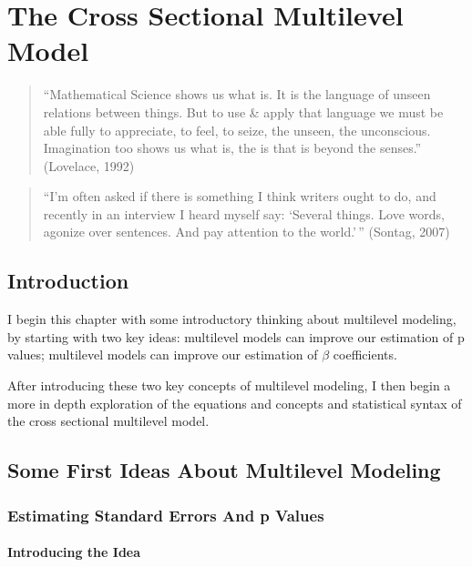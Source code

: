 \documentclass[
  letterpaper,
  DIV=11,
  numbers=noendperiod]{scrreprt}
\begin{document}

\chapter{The Cross Sectional Multilevel Model}\label{sec-crosssectional}

\begin{quote}
``Mathematical Science shows us what is. It is the language of unseen
relations between things. But to use \& apply that language we must be
able fully to appreciate, to feel, to seize, the unseen, the
unconscious. Imagination too shows us what is, the is that is beyond the
senses.'' (Lovelace, 1992) 
\end{quote}

\begin{quote}
``I'm often asked if there is something I think writers ought to do, and
recently in an interview I heard myself say: `Several things. Love
words, agonize over sentences. And pay attention to the world.'\,''
(Sontag, 2007) 
\end{quote}

\section{Introduction}\label{introduction-1}

I begin this chapter with some introductory thinking about multilevel
modeling, by starting with two key ideas: multilevel models can improve
our estimation of p values; multilevel models can improve our estimation
of \(\beta\) coefficients. 

After introducing these two key concepts of multilevel modeling, I then
begin a more in depth exploration of the equations and concepts and
statistical syntax of the cross sectional multilevel model.

\section{Some First Ideas About Multilevel
Modeling}\label{some-first-ideas-about-multilevel-modeling}

\subsection{Estimating Standard Errors And p Values}\label{sec-pvalues}

\subsubsection{Introducing the Idea}\label{introducing-the-idea}
\end{document}
